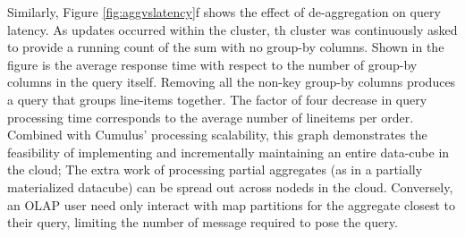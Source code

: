 Similarly, Figure \ref{fig:aggvslatency}f shows the effect of de-aggregation on query latency.  As updates occurred within the cluster, th cluster was continuously asked to provide a running count of the sum with no group-by columns.  Shown in the figure is the average response time with respect to the number of group-by columns in the query itself.  Removing all the non-key group-by columns produces a query that groups line-items together.  The factor of four decrease in query processing time corresponds to the average number of lineitems per order.  Combined with Cumulus' processing scalability, this graph demonstrates the feasibility of implementing and incrementally maintaining an entire data-cube in the cloud; The extra work of processing partial aggregates (as in a partially materialized datacube) can be spread out across nodeds in the cloud.  Conversely, an OLAP user need only interact with map partitions for the aggregate closest to their query, limiting the number of message required to pose the query.

